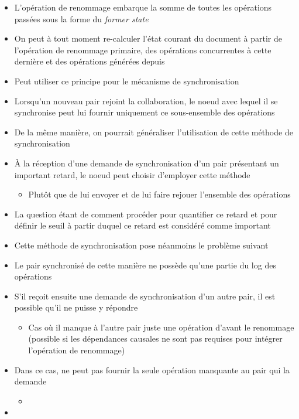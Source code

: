 \documentclass[12pt]{thesul}
\begin{document}
\begin{itemize}
  \item L'opération de renommage embarque la somme de toutes les opérations passées sous la forme du \emph{former state}
  \item On peut à tout moment re-calculer l'état courant du document à partir de l'opération de renommage primaire, des opérations concurrentes à cette dernière et des opérations générées depuis
  \item Peut utiliser ce principe pour le mécanisme de synchronisation
  \item Lorsqu'un nouveau pair rejoint la collaboration, le noeud avec lequel il se synchronise peut lui fournir uniquement ce sous-ensemble des opérations
  \item De la même manière, on pourrait généraliser l'utilisation de cette méthode de synchronisation
  \item À la réception d'une demande de synchronisation d'un pair présentant un important retard, le noeud peut choisir d'employer cette méthode
  \begin{itemize}
    \item Plutôt que de lui envoyer et de lui faire rejouer l'ensemble des opérations
  \end{itemize}
  \item La question étant de comment procéder pour quantifier ce retard et pour définir le seuil à partir duquel ce retard est considéré comme important
  \item Cette méthode de synchronisation pose néanmoins le problème suivant
  \item Le pair synchronisé de cette manière ne possède qu'une partie du log des opérations
  \item S'il reçoit ensuite une demande de synchronisation d'un autre pair, il est possible qu'il ne puisse y répondre
  \begin{itemize}
    \item Cas où il manque à l'autre pair juste une opération d'avant le renommage (possible si les dépendances causales ne sont pas requises pour intégrer l'opération de renommage)
  \end{itemize}
  \item Dans ce cas, ne peut pas fournir la seule opération manquante au pair qui la demande
  \begin{itemize}
    \item {}
  \end{itemize}
  \item {}
\end{itemize}
\end{document}
